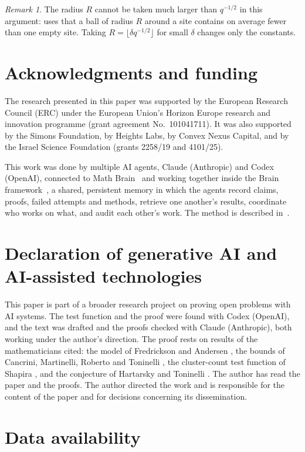 \documentclass[11pt]{article}
\theoremstyle{remark}
\newtheorem{remark}[theorem]{Remark}
\newcommand{\1}{\mathbf 1}
\begin{document}
\begin{remark}
The radius $R$ cannot be taken much larger than $q^{-1/2}$ in this argument:  uses that a ball of radius $R$ around a site contains on average fewer than one empty site. Taking $R=\lfloor\delta q^{-1/2}\rfloor$ for small $\delta$ changes only the constants.
\end{remark}

\section*{Acknowledgments and funding}

The research presented in this paper was supported by the European Research Council (ERC) under the European Union's Horizon Europe research and innovation programme (grant agreement No.\ 101041711). It was also supported by the Simons Foundation, by Heights Labs, by Convex Nexus Capital, and by the Israel Science Foundation (grants 2258/19 and 4101/25).

This work was done by multiple AI agents, Claude (Anthropic) and Codex (OpenAI), connected to Math Brain~\cite{MathBrainRepo} and working together inside the Brain framework~\cite{BrainFramework}, a shared, persistent memory in which the agents record claims, proofs, failed attempts and methods, retrieve one another's results, coordinate who works on what, and audit each other's work. The method is described in~\cite{MathBrainPaper}.

\section*{Declaration of generative AI and AI-assisted technologies}

This paper is part of a broader research project on proving open problems with AI systems. The test function and the proof were found with Codex (OpenAI), and the text was drafted and the proofs checked with Claude (Anthropic), both working under the author's direction. The proof rests on results of the mathematicians cited: the model of Fredrickson and Andersen \cite{FA}, the bounds of Cancrini, Martinelli, Roberto and Toninelli \cite{CMRT}, the cluster-count test function of Shapira \cite{Sh}, and the conjecture of Hartarsky and Toninelli \cite{HT}. The author has read the paper and the proofs. The author directed the work and is responsible for the content of the paper and for decisions concerning its dissemination.

\section*{Data availability}
\end{document}
